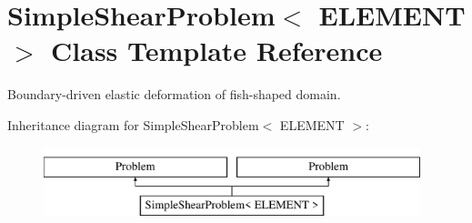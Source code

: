 \hypertarget{classSimpleShearProblem}{}\section{Simple\+Shear\+Problem$<$ E\+L\+E\+M\+E\+NT $>$ Class Template Reference}
\label{classSimpleShearProblem}


Boundary-\/driven elastic deformation of fish-\/shaped domain.  


Inheritance diagram for Simple\+Shear\+Problem$<$ E\+L\+E\+M\+E\+NT $>$\+:\begin{figure}[H]
\begin{center}
\leavevmode
\includegraphics[height=2.000000cm]{classSimpleShearProblem}
\end{center}
\end{figure}
